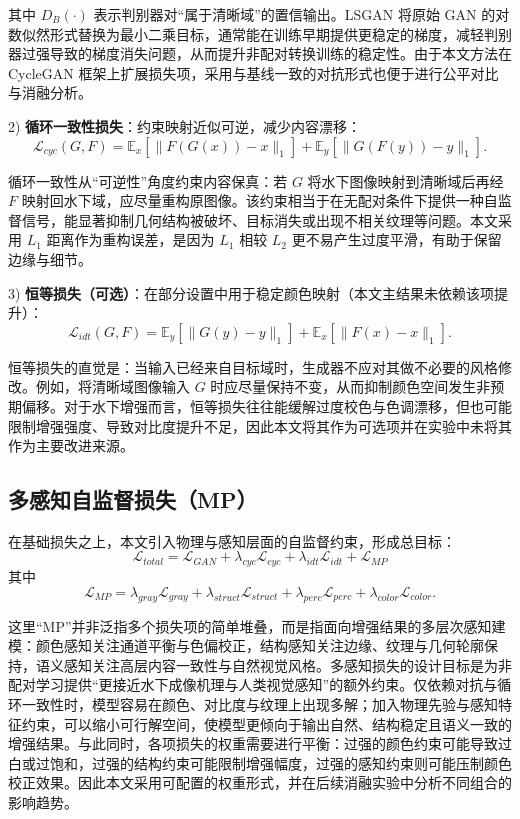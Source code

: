 \documentclass[a4paper,zihao=-4,linespread=1.25]{ctexart}
\begin{document}
其中 $D_B(\cdot)$ 表示判别器对“属于清晰域”的置信输出。LSGAN 将原始 GAN 的对数似然形式替换为最小二乘目标，通常能在训练早期提供更稳定的梯度，减轻判别器过强导致的梯度消失问题，从而提升非配对转换训练的稳定性。由于本文方法在 CycleGAN 框架上扩展损失项，采用与基线一致的对抗形式也便于进行公平对比与消融分析。

2) \textbf{循环一致性损失}：约束映射近似可逆，减少内容漂移：
\begin{equation}
\mathcal{L}_{cyc}(G,F)=\mathbb{E}_{x}[\|F(G(x))-x\|_1]+\mathbb{E}_{y}[\|G(F(y))-y\|_1].
\end{equation}

循环一致性从“可逆性”角度约束内容保真：若 $G$ 将水下图像映射到清晰域后再经 $F$ 映射回水下域，应尽量重构原图像。该约束相当于在无配对条件下提供一种自监督信号，能显著抑制几何结构被破坏、目标消失或出现不相关纹理等问题。本文采用 $L_1$ 距离作为重构误差，是因为 $L_1$ 相较 $L_2$ 更不易产生过度平滑，有助于保留边缘与细节。

3) \textbf{恒等损失（可选）}：在部分设置中用于稳定颜色映射（本文主结果未依赖该项提升）：
\begin{equation}
\mathcal{L}_{idt}(G,F)=\mathbb{E}_{y}[\|G(y)-y\|_1]+\mathbb{E}_{x}[\|F(x)-x\|_1].
\end{equation}

恒等损失的直觉是：当输入已经来自目标域时，生成器不应对其做不必要的风格修改。例如，将清晰域图像输入 $G$ 时应尽量保持不变，从而抑制颜色空间发生非预期偏移。对于水下增强而言，恒等损失往往能缓解过度校色与色调漂移，但也可能限制增强强度、导致对比度提升不足，因此本文将其作为可选项并在实验中未将其作为主要改进来源。

\subsection{多感知自监督损失（MP）}
在基础损失之上，本文引入物理与感知层面的自监督约束，形成总目标：
\begin{equation}
\mathcal{L}_{total}=\mathcal{L}_{GAN}+\lambda_{cyc}\mathcal{L}_{cyc}+\lambda_{idt}\mathcal{L}_{idt}+\mathcal{L}_{MP}
\end{equation}
其中
\begin{equation}
\mathcal{L}_{MP}=\lambda_{gray}\mathcal{L}_{gray}+\lambda_{struct}\mathcal{L}_{struct}+\lambda_{perc}\mathcal{L}_{perc}+\lambda_{color}\mathcal{L}_{color}.
\end{equation}

这里“MP”并非泛指多个损失项的简单堆叠，而是指面向增强结果的多层次感知建模：颜色感知关注通道平衡与色偏校正，结构感知关注边缘、纹理与几何轮廓保持，语义感知关注高层内容一致性与自然视觉风格。多感知损失的设计目标是为非配对学习提供“更接近水下成像机理与人类视觉感知”的额外约束。仅依赖对抗与循环一致性时，模型容易在颜色、对比度与纹理上出现多解；加入物理先验与感知特征约束，可以缩小可行解空间，使模型更倾向于输出自然、结构稳定且语义一致的增强结果。与此同时，各项损失的权重需要进行平衡：过强的颜色约束可能导致过白或过饱和，过强的结构约束可能限制增强幅度，过强的感知约束则可能压制颜色校正效果。因此本文采用可配置的权重形式，并在后续消融实验中分析不同组合的影响趋势。
\end{document}
